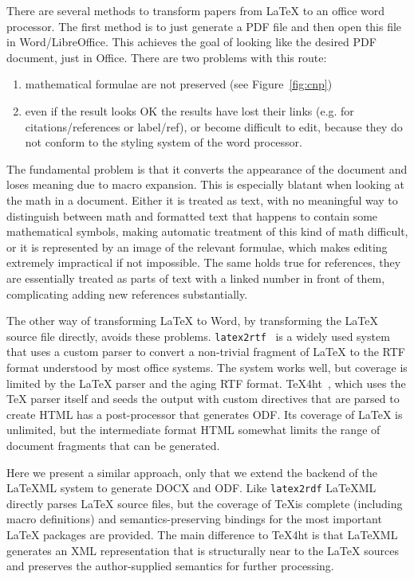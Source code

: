 \documentclass{llncs}
\def\latexml{{\LaTeX}ML\xspace}
\begin{document}
There are several methods to transform papers from {\LaTeX} to an office word
processor. The first method is to just generate a PDF file and then open this file in
Word/LibreOffice. This achieves the goal of looking like the desired PDF document, just in
Office. There are two problems with this route: 
\begin{enumerate}
\item mathematical formulae are not preserved (see Figure~\ref{fig:cnp})
\item even if the result looks OK the results have lost their links (e.g. for
  citations/references or label/ref), or become difficult to edit, because they do not
  conform to the styling system of the word processor.
\end{enumerate}
The fundamental problem is that it converts the appearance of the document and loses
meaning due to macro expansion. This is especially blatant when looking at the math in a
document. Either it is treated as text, with no meaningful way to distinguish between math
and formatted text that happens to contain some mathematical symbols, making automatic
treatment of this kind of math difficult, or it is represented by an image of the relevant
formulae, which makes editing extremely impractical if not impossible. The same holds true
for references, they are essentially treated as parts of text with a linked number in
front of them, complicating adding new references substantially.

The other way of transforming {\LaTeX} to Word, by transforming the {\LaTeX} source file
directly, avoids these problems. \texttt{latex2rtf}~\cite{latex2rtf:on} is a widely used
system that uses a custom parser to convert a non-trivial fragment of {\LaTeX} to the RTF
format understood by most office systems. The system works well, but coverage is limited
by the {\LaTeX} parser and the aging RTF format.  TeX4ht~\cite{tex4ht:online}, which uses
the {\TeX} parser itself and seeds the output with custom directives that are parsed to
create HTML has a post-processor that generates ODF. Its coverage of {\LaTeX} is unlimited,
but the intermediate format HTML somewhat limits the range of document fragments that can
be generated. 

Here we present a similar approach, only that we extend the backend of the \latexml system
to generate DOCX and ODF. Like \texttt{latex2rdf} \latexml directly parses {\LaTeX} source
files, but the coverage of \TeX is complete (including macro definitions) and
semantics-preserving bindings for the most important {\LaTeX} packages are provided. The
main difference to TeX4ht is that \latexml generates an XML representation that is
structurally near to the {\LaTeX} sources and preserves the author-supplied semantics for
further processing.
\end{document}
